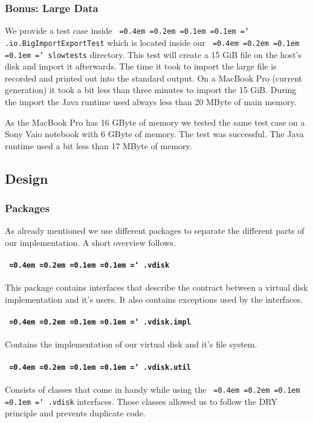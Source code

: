 \documentclass[a4paper,12pt]{article}
\newcommand*\justify{%
  \fontdimen2\font=0.4em%
  \fontdimen3\font=0.2em%
  \fontdimen4\font=0.1em%
  \fontdimen7\font=0.1em%
  \hyphenchar\font=`\-%
}
\newcommand{\mono}[1]{\texttt{\justify #1}}
\begin{document}
\subsubsection{Bonus: Large Data}
We provide a test case inside \mono{.io.BigImportExportTest} which is located inside our \mono{slowtests} directory. This test will create a 15 GiB file on the host's disk and import it afterwards. The time it took to import the large file is recorded and printed out into the standard output. On a MacBook Pro (current generation) it took a bit less than three minutes to import the 15 GiB. During the import the Java runtime used always less than 20 MByte of main memory.

As the MacBook Pro has 16 GByte of memory we tested the same test case on a Sony Vaio notebook with 6 GByte of memory. The test was successful. The Java runtime used a bit less than 17 MByte of memory.

\subsection{Design}

\subsubsection{Packages}
As already mentioned we use different packages to separate the different parts of our implementation. A short overview follows.

\paragraph{\mono{.vdisk}}
This package contains interfaces that describe the contract between a virtual disk implementation and it's users. It also contains exceptions used by the interfaces.

\paragraph{\mono{.vdisk.impl}}
Contains the implementation of our virtual disk and it's file system.

\paragraph{\mono{.vdisk.util}}
Consists of classes that come in handy while using the \mono{.vdisk} interfaces. Those classes allowed us to follow the DRY principle and prevents duplicate code.
\end{document}
